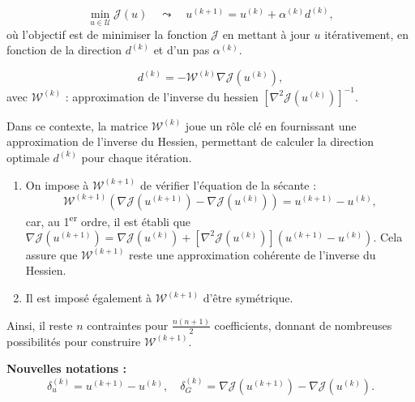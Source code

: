 \begin{sloppypar}
\begin{tcolorbox}
    \begin{equation}
        \min_{u \in \mathcal{U}} \mathcal{J}(u) \quad \leadsto \quad u^{(k+1)} = u^{(k)} + \alpha^{(k)} d^{(k)},
    \end{equation}
    où l'objectif est de minimiser la fonction $\mathcal{J}$ en mettant à jour $u$ itérativement, en fonction de la direction $d^{(k)}$ et d'un pas $\alpha^{(k)}$.

    \begin{equation}
        d^{(k)} = -\mathcal{W}^{(k)} \nabla \mathcal{J}(u^{(k)}),
    \end{equation}
    avec \quad $\mathcal{W}^{(k)}$ : approximation de l'inverse du hessien \quad $\left[\nabla^2 \mathcal{J}(u^{(k)})\right]^{-1}$.
\end{tcolorbox}

Dans ce contexte, la matrice $\mathcal{W}^{(k)}$ joue un rôle clé en fournissant une approximation de l'inverse du Hessien, permettant de calculer la direction optimale $d^{(k)}$ pour chaque itération.

\begin{enumerate}
    \item On impose à $\mathcal{W}^{(k+1)}$ de vérifier l'équation de la sécante :
    \begin{equation*}
        \mathcal{W}^{(k+1)} \left(\nabla \mathcal{J}(u^{(k+1)}) - \nabla \mathcal{J}(u^{(k)})\right) = u^{(k+1)} - u^{(k)},
    \end{equation*}
    car, au 1\textsuperscript{er} ordre, il est établi que \quad $\nabla \mathcal{J}(u^{(k+1)}) = \nabla \mathcal{J}(u^{(k)}) + \left[\nabla^2 \mathcal{J}(u^{(k)})\right](u^{(k+1)} - u^{(k)})$.  
    Cela assure que $\mathcal{W}^{(k+1)}$ reste une approximation cohérente de l'inverse du Hessien.

    \item Il est imposé également à $\mathcal{W}^{(k+1)}$ d’être symétrique.
\end{enumerate}

Ainsi, il reste $n$ contraintes pour $\frac{n(n+1)}{2}$ coefficients, donnant de nombreuses possibilités pour construire $\mathcal{W}^{(k+1)}$.

\vspace{0.3cm}

\textbf{Nouvelles notations :}
\begin{equation}
    \delta_u^{(k)} = u^{(k+1)} - u^{(k)}, \quad \delta_G^{(k)} = \nabla \mathcal{J}(u^{(k+1)}) - \nabla \mathcal{J}(u^{(k)}).
\end{equation}


\end{sloppypar}
